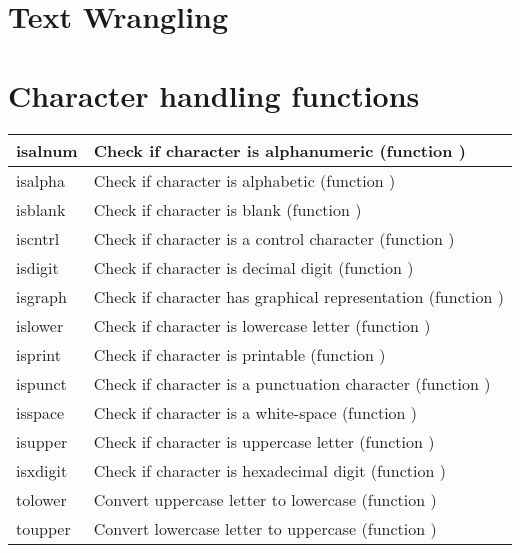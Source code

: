 \documentclass{article}
\begin{document}
\section{Text Wrangling}
\section*{Character handling functions}
\begin{tabular}{|l|l|}
\hline
isalnum & Check if character is alphanumeric (function )\\ 
 \hline 
isalpha & Check if character is alphabetic (function )\\ 
 \hline 
isblank & Check if character is blank (function )\\ 
 \hline 
iscntrl & Check if character is a control character (function )\\ 
 \hline 
isdigit & Check if character is decimal digit (function )\\ 
 \hline 
isgraph & Check if character has graphical representation (function )\\ 
 \hline 
islower & Check if character is lowercase letter (function )\\ 
 \hline 
isprint & Check if character is printable (function )\\ 
 \hline 
ispunct & Check if character is a punctuation character (function )\\ 
 \hline 
isspace & Check if character is a white-space (function )\\ 
 \hline 
isupper & Check if character is uppercase letter (function )\\ 
 \hline 
isxdigit & Check if character is hexadecimal digit (function )\\ 
 \hline 
tolower & Convert uppercase letter to lowercase (function )\\ 
 \hline 
toupper & Convert lowercase letter to uppercase (function ) \\
\hline
\end{tabular}
\end{document}
